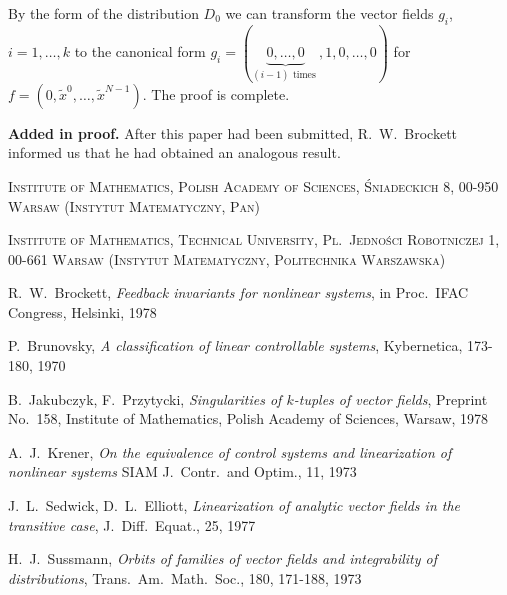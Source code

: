 \documentclass[leqno]{article}
\theoremstyle{plain}
\numberwithin{equation}{section}
\begin{document}
By the form of the distribution $D_{0}$ we can transform the vector fields $g_{i}$, $i=1, \ldots, k$ to the canonical form $g_{i}=(\underbrace{0, \ldots, 0}_{(i-1) \text { times }}, 1,0, \ldots, 0)$ for $f=\left(0, \tilde{x}^{0}, \ldots, \tilde{x}^{N-1}\right)$. 
The proof is complete.

\bigskip

\textbf{Added in proof.} After this paper had been submitted, R.\ W.\ Brockett informed us that he had obtained an analogous result.

\bigskip

{\footnotesize
\textsc{Institute of Mathematics, Polish Academy of Sciences, \'Sniadeckich 8, 00-950 Warsaw (Instytut Matematyczny, Pan)}

\textsc{Institute of Mathematics, Technical University, Pl.\ Jedno\'sci Robotniczej 1, 00-661 Warsaw (Instytut Matematyczny, Politechnika Warszawska)}
}

\begin{thebibliography}{1}
	
	R.\ W.\ Brockett,
	\newblock \emph{Feedback invariants for nonlinear systems},
	\newblock in Proc.\ IFAC Congress, Helsinki, 1978
		
	 P.\ Brunovsky,
	\newblock \emph{A classification of linear controllable systems},
	\newblock Kybernetica, 173-180, 1970
		
	 B.\ Jakubczyk, F.\ Przytycki,
	\newblock \emph{Singularities of $k$-tuples of vector fields},
	\newblock Preprint No.\ 158, Institute of Mathematics, Polish Academy of Sciences, Warsaw, 1978
		
	 A.\ J.\ Krener,
	\newblock \emph{On the equivalence of control systems and linearization of nonlinear systems}
	\newblock SIAM J.\ Contr.\ and Optim., 11, 1973
		
	 J.\ L.\ Sedwick, D.\ L.\ Elliott,
	\newblock \emph{Linearization of analytic vector fields in the transitive case},
	\newblock J.\ Diff.\ Equat., 25, 1977
		
	 H.\ J.\ Sussmann,
	\newblock \emph{Orbits of families of vector fields and integrability of distributions},
	\newblock Trans.\ Am.\ Math.\ Soc., 180, 171-188, 1973

\end{thebibliography}
\end{document}
